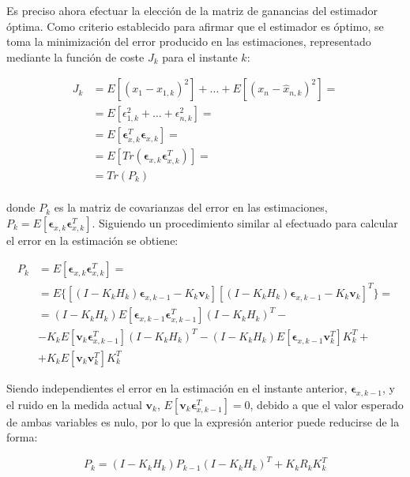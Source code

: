 Es preciso ahora efectuar la elección de la matriz de ganancias del estimador óptima. Como criterio establecido para afirmar que el estimador es óptimo, se toma la minimización del error producido en las estimaciones, representado mediante la función de coste $J_k$ para el instante $k$: 

\begin{equation}
\begin{split}
	J_k &= E[(x_1 - \hat{x}_{1,k})^2] + \ldots + E[(x_n - \hat{x}_{n,k})^2] = \\
	&= E[\epsilon_{1,k}^2 + \ldots + \epsilon_{n,k}^2] = \\
	&= E[\boldsymbol{\epsilon}_{x,k}^T \boldsymbol{\epsilon}_{x,k}] = \\
	&= E[Tr(\boldsymbol{\epsilon}_{x,k} \boldsymbol{\epsilon}_{x,k}^T)] = \\
	&= Tr(P_k)
\end{split}
\label{eq:funcioncoste}
\end{equation} \\
\noindent
donde $P_k$ es la matriz de covarianzas del error en las estimaciones, $P_k = E[\boldsymbol{\epsilon}_{x,k} \boldsymbol{\epsilon}_{x,k}^T]$. Siguiendo un procedimiento similar al efectuado para calcular el error en la estimación se obtiene:

\[
\begin{split}
	P_k &= E[\boldsymbol{\epsilon}_{x,k} \boldsymbol{\epsilon}_{x,k}^T] = \\
	&= E\{[(I - K_kH_k)\boldsymbol{\epsilon}_{x,k-1} - K_k\boldsymbol{v}_k] [(I - K_kH_k)\boldsymbol{\epsilon}_{x,k-1} - K_k\boldsymbol{v}_k]^T\} = \\
	&= (I - K_kH_k)E[\boldsymbol{\epsilon}_{x,k-1} \boldsymbol{\epsilon}_{x,k-1}^T](I - K_kH_k)^T - \\
	&- K_kE[\boldsymbol{v}_k\boldsymbol{\epsilon}_{x,k-1}^T](I - K_kH_k)^T - (I - K_kH_k)E[\boldsymbol{\epsilon}_{x,k-1} \boldsymbol{v}_k^T]K_k^T + \\
	&+ K_kE[\boldsymbol{v}_k\boldsymbol{v}_k^T] K_k^T
\end{split}
\]

Siendo independientes el error en la estimación en el instante anterior, $\boldsymbol{\epsilon}_{x,k-1}$, y el ruido en la medida actual $\boldsymbol{v}_k$, $E[\boldsymbol{v}_k\boldsymbol{\epsilon}_{x,k-1}^T] = 0$, debido a que el valor esperado de ambas variables es nulo, por lo que la expresión anterior puede reducirse de la forma:

\begin{equation}
	P_k = (I - K_kH_k)P_{k-1}(I - K_kH_k)^T + K_k R_k K_k^T
\label{eq:ecuacionP}
\end{equation}

